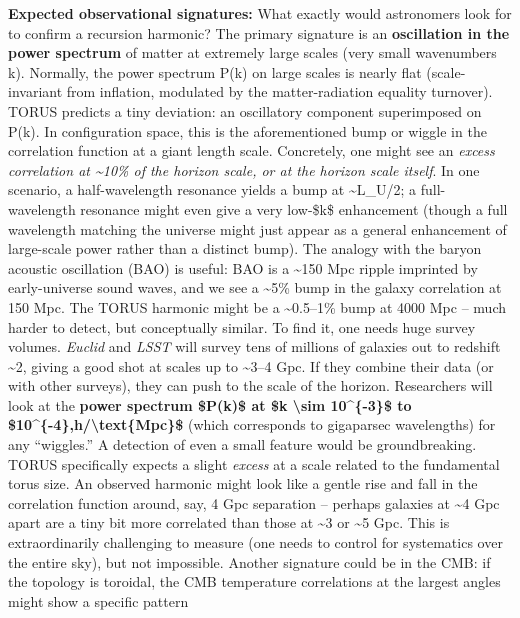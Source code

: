 \documentclass[
]{article}
\begin{document}
{\textbf{Expected observational signatures:} What exactly would
astronomers look for to confirm a recursion harmonic? The primary
signature is an \textbf{oscillation in the power spectrum} of matter at
extremely large scales (very small wavenumbers k). Normally, the power
spectrum P(k) on large scales is nearly flat (scale-invariant from
inflation, modulated by the matter-radiation equality turnover). TORUS
predicts a tiny deviation: an oscillatory component superimposed on
P(k). In configuration space, this is the aforementioned bump or wiggle
in the correlation function at a giant length scale. Concretely, one
might see an \emph{excess correlation at \textasciitilde10\% of the
horizon scale, or at the horizon scale itself}. In one scenario, a
half-wavelength resonance yields a bump at
\textasciitilde L_{U}/2;
a full-wavelength resonance might even give a very low-\$k\$ enhancement
(though a full wavelength matching the universe might just appear as a
general enhancement of large-scale power rather than a distinct bump).
The analogy with the baryon acoustic oscillation (BAO) is useful: BAO is
a \textasciitilde150 Mpc ripple imprinted by early-universe sound waves,
and we see a \textasciitilde5\% bump in the galaxy correlation at 150
Mpc. The TORUS harmonic might be a \textasciitilde0.5--1\% bump at 4000
Mpc -- much harder to detect, but conceptually similar. To find it, one
needs huge survey volumes. \emph{Euclid} and \emph{LSST} will survey
tens of millions of galaxies out to redshift \textasciitilde2, giving a
good shot at scales up to \textasciitilde3--4 Gpc. If they combine their
data (or with other surveys), they can push to the scale of the horizon.
Researchers will look at the \textbf{power spectrum \$P(k)\$ at \$k
\textbackslash sim 10\^{}\{-3\}\$ to
\$10\^{}\{-4\},h/\textbackslash text\{Mpc\}\$} (which corresponds to
gigaparsec wavelengths) for any ``wiggles.'' A detection of even a small
feature would be groundbreaking. TORUS specifically expects a slight
\emph{excess} at a scale related to the fundamental torus
size\hspace{0pt}. An observed harmonic might look like a gentle rise and
fall in the correlation function around, say, 4 Gpc separation --
perhaps galaxies at \textasciitilde4 Gpc apart are a tiny bit more
correlated than those at \textasciitilde3 or \textasciitilde5 Gpc. This
is extraordinarily challenging to measure (one needs to control for
systematics over the entire sky), but not impossible. Another signature
could be in the CMB: if the topology is toroidal, the CMB temperature
correlations at the largest angles might show a specific pattern
}
\end{document}
